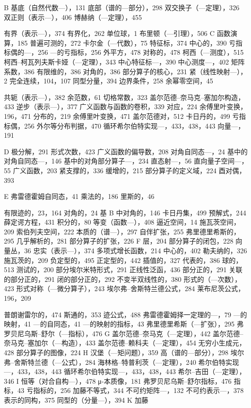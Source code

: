 B 基底（自然代数---），131 底部（谱的---部分），298 双交换子（---定理），326 双正则（表示---），406 博赫纳（---定理），455

有界（表示---），374 有界化，262 单位球，1 布里顿（---引理），506 C 函数演算，185 普遍可测的，272 卡尔金（---代数），75 特征标，374 中心的，390 亏指标偶的---，256 ---的亏指标，256 外平方，478 对称的，478 柯西（---测度），515 柯西--柯瓦列夫斯卡娅（---定理），343 中心特征标---，390 中心测度---，402 矩阵系数，386 有限维的，386 对角的，386 部分算子的核心，231 紧（线性映射---），2 完全连续，104，107 同型分量，394 边界条件，258 余幂零空间，45

共轭（表示---），382 余范数，61 切格常数，323 盖尔范德--奈马克--塞加尔构造，433 逆步（表示---），377 广义函数与函数的卷积，339 对应，224 余傅里叶变换，196，471 分布的，219 余傅里叶变换，471 盖尔范德对，512 卡日丹的，499 亏指标偶，256 外尔等分布判据，470 循环希尔伯特实现---，433，438，443 向量---，191

D 极分解，291 形式次数，423 广义函数的偏导数，208 对角自同态---，24 基中的对角自同态---，146 基中的对角部分算子---，234 直态射---，56 直向量子空间---，55 广义函数，203 紧支撑的，336 缓增的，215 部分算子的定义域，224 酉对偶，393

E 弗雷德霍姆自同态，41 乘法的，186 里斯的，46

有限迹的，23，164 对角的，24 基 B 中对角的，146 卡日丹集，499 预解式，244 薛定谔方程，431 积分的，80 等变（函数---），408 逼近空间，14 施瓦茨空间，209 索伯列夫空间，222 本质的（谱---），297 自伴扩张，255 弗里德里希斯的，295 几乎解析的，281 部分算子的扩张，226 F 层，204 部分算子的闭包，228 向量丛，36 忠实（表示---），374 多项式增长函数，214 中心的，402 勒夫纳的，326 施瓦茨的，209 负定型的，495 正定型的，442 插值的，327 代表的，386 球的，513 测试的，200 部分埃尔米特形式，291 正线性泛函，436 部分正的，291 关联的部分正的，291 闭的部分正的，292 不变半双线性的，380 形式的（---次数），423 形式对称（---微分算子），243 埃尔弗--舍斯特兰德公式，284 莱布尼茨公式，196，209

普朗谢雷尔的，474 斯通的，353 迹公式，488 弗雷德霍姆择一定理的---，79 ---的映射，41 ---的自同态，41 ---的映射的指标，43 弗里德里希斯（---扩张），295 弗罗贝尼乌斯--舒尔（---指标），476 G 盖尔范德--奈马克（---定理），442 盖尔范德--奈马克--塞加尔（---构造），433 盖尔范德--赖科夫（---定理），454 无穷小生成元，428 部分算子的图像，224 H 汉堡（---矩问题），359 高（谱的---部分），298 埃尔弗--舍斯特兰德（---公式），284 海林格--特普利茨（---定理），240 希尔伯特实现---，433，438，443 循环希尔伯特实现---，433，438，443 希尔--吉田（---定理），346 I 恒等（对合自构---），478 μ-本质像，181 弗罗贝尼乌斯--舒尔指标，476 指标，43 亏指标的，256 加藤不等式，344 不可约矩阵---，132 不可约表示---，378 表示的同构，375 同型的（分量---），394 K 加藤

